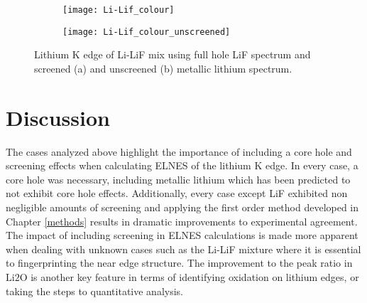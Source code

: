 \begin{figure}
	\centering
	\begin{subfigure}{0.45\textwidth}
		
		\texttt{[image: Li-Lif\_colour]}
		\caption{}
		\label{mix-screened}
	\end{subfigure}
	\hspace{-0.01cm}
	\begin{subfigure}{0.45\textwidth}
		\texttt{[image: Li-Lif\_colour\_unscreened]}
		\caption{}
		\label{mix-unscreened}
	\end{subfigure}
	\caption{Lithium K edge of Li-LiF mix using full hole LiF spectrum and screened (a) and unscreened (b) metallic lithium spectrum. }
	
	\label{Li-LiF_mix_screened}
\end{figure}





\section{Discussion}
The  cases analyzed above highlight the importance of including a core hole and screening effects when calculating ELNES of the lithium K edge.  In every case, a core hole was necessary, including metallic lithium which has been predicted to not exhibit core hole effects.  Additionally, every case except LiF exhibited non negligible amounts of screening  and applying the first order method developed in Chapter \ref{methods} results in dramatic improvements to experimental agreement.  The impact of including screening in ELNES calculations is made more apparent when dealing with unknown cases such as the Li-LiF mixture where it is essential to fingerprinting the near edge structure.  The improvement to the peak ratio in $ \mathrm{Li2O} $ is another key feature in terms of identifying oxidation on lithium edges, or taking the steps to quantitative analysis.  \\

